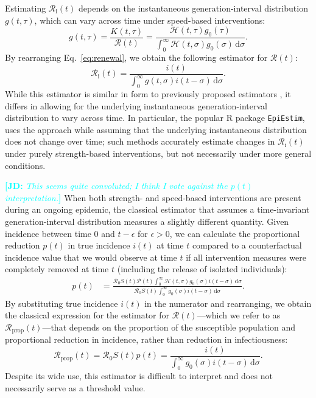\documentclass[12pt]{article}
\newcommand{\comment}{\showcomment}
\newcommand{\showcomment}[3]{\textcolor{#1}{\textbf{[#2: }\textsl{#3}\textbf{]}}}
\newcommand{\jd}[1]{\comment{cyan}{JD}{#1}}
\newcommand{\eref}[1]{Eq.~\ref{eq:#1}}
\newcommand{\Rx}[1]{\ensuremath{{\mathcal R}_{#1}}\xspace}
\newcommand{\Ro}{\Rx{0}}
\newcommand{\Ri}{\Rx{\mathrm{i}}}
\newcommand{\RR}{\ensuremath{{\mathcal R}}\xspace}
\newcommand{\Rprop}{\Rx{\mathrm{prop}}}
\newcommand{\dd}[1]{\ensuremath{\, \mathrm{d}#1}}
\newcommand{\dsigma}{\dd{\sigma}}
\newcommand{\PP}{\ensuremath{\mathcal P}}
\newcommand{\HH}{\ensuremath{\mathcal H}}
\begin{document}
Estimating $\Ri(t)$ depends on the instantaneous generation-interval distribution $g(t, \tau)$,
which can vary across time under speed-based interventions:
\begin{equation}
g(t, \tau) = \frac{K(t, \tau)}{\RR(t)} = \frac{\HH(t,\tau) g_0(\tau)}{\int_0^\infty \HH(t,\sigma) g_0(\sigma) \dsigma}.
\end{equation}
By rearranging \eref{renewal}, we obtain the following estimator for $\RR(t)$:
\begin{equation}
\Ri(t) = \frac{i(t)}{\int_0^\infty g(t, \sigma) i(t-\sigma) \dsigma}.
\end{equation}
While this estimator is similar in form to previously proposed estimators \citep{fraser2007estimating}, it differs in allowing for the underlying instantaneous generation-interval distribution to vary across time.
In particular, the popular R package \texttt{EpiEstim}, \cite{cori2013new} uses the approach while assuming that the underlying instantaneous distribution does not change over time; 
such methods accurately estimate changes in $\Ri(t)$ under purely strength-based interventions, but not necessarily under more general conditions.

\jd{This seems quite convoluted; I think I vote against the $p(t)$ interpretation.}
When both strength- and speed-based interventions are present during an ongoing epidemic, the classical estimator that assumes a time-invariant generation-interval distribution measures a slightly different quantity.
Given incidence between time $0$ and $t-\epsilon$ for $\epsilon > 0$, we can calculate the proportional reduction $p(t)$ in true incidence $i(t)$ at time $t$ compared to a counterfactual incidence value that we would observe at time $t$ if all intervention measures were completely removed at time $t$ (including the release of isolated individuals):
\begin{align}
p(t) &= \frac{\Ro S(t) \PP(t) \int_0^\infty \HH(t, \sigma) g_0(\sigma) i(t-\sigma)\dsigma}{\Ro S(t) \int_0^\infty g_0(\sigma) i(t-\sigma) \dsigma}.
\end{align}
By substituting true incidence $i(t)$ in the numerator and rearranging, we obtain the classical expression for the estimator for $\RR(t)$---which we refer to as $\Rprop(t)$---that depends on the proportion of the susceptible population and proportional reduction in incidence, rather than reduction in infectiousness:
\begin{equation}
\Rprop(t) = \Ro S(t) p(t) = \frac{i(t)}{\int_0^\infty g_0(\sigma) i(t-\sigma) \dsigma}.
\end{equation}
Despite its wide use, this estimator is difficult to interpret and does not necessarily serve as a threshold value.
\end{document}

